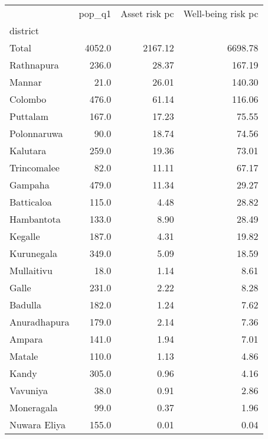 \begin{tabular}{lrrr}
\toprule
{} &  pop\_q1 &  Asset risk pc &  Well-being risk pc \\
district     &         &                &                     \\
\midrule
Total        &  4052.0 &        2167.12 &             6698.78 \\
Rathnapura   &   236.0 &          28.37 &              167.19 \\
Mannar       &    21.0 &          26.01 &              140.30 \\
Colombo      &   476.0 &          61.14 &              116.06 \\
Puttalam     &   167.0 &          17.23 &               75.55 \\
Polonnaruwa  &    90.0 &          18.74 &               74.56 \\
Kalutara     &   259.0 &          19.36 &               73.01 \\
Trincomalee  &    82.0 &          11.11 &               67.17 \\
Gampaha      &   479.0 &          11.34 &               29.27 \\
Batticaloa   &   115.0 &           4.48 &               28.82 \\
Hambantota   &   133.0 &           8.90 &               28.49 \\
Kegalle      &   187.0 &           4.31 &               19.82 \\
Kurunegala   &   349.0 &           5.09 &               18.59 \\
Mullaitivu   &    18.0 &           1.14 &                8.61 \\
Galle        &   231.0 &           2.22 &                8.28 \\
Badulla      &   182.0 &           1.24 &                7.62 \\
Anuradhapura &   179.0 &           2.14 &                7.36 \\
Ampara       &   141.0 &           1.94 &                7.01 \\
Matale       &   110.0 &           1.13 &                4.86 \\
Kandy        &   305.0 &           0.96 &                4.16 \\
Vavuniya     &    38.0 &           0.91 &                2.86 \\
Moneragala   &    99.0 &           0.37 &                1.96 \\
Nuwara Eliya &   155.0 &           0.01 &                0.04 \\
\bottomrule
\end{tabular}
